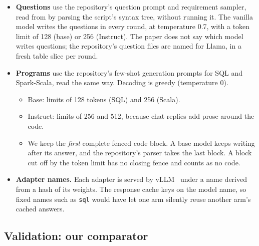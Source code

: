 \begin{itemize}
\item \textbf{Questions} use the repository's question prompt and requirement sampler, read from
 by parsing the script's syntax tree, without running it. The vanilla model
writes the questions in every round, at temperature 0.7, with a token limit of 128 (base) or 256 (Instruct). The paper
does not say which model writes questions; the repository's question files are named for Llama, in a fresh table slice
per round.
\item \textbf{Programs} use the repository's few-shot generation prompts for SQL and Spark-Scala, read the same way.
Decoding is greedy (temperature 0).
\begin{itemize}
\item Base: limits of 128 tokens (SQL) and 256 (Scala).
\item Instruct: limits of 256 and 512, because chat replies add prose around the code.
\item We keep the \emph{first} complete fenced code block. A base model keeps writing after its answer, and the
repository's parser takes the last block. A block cut off by the token limit has no closing fence and counts as no
code.
\end{itemize}
\item \textbf{Adapter names.} Each adapter is served by vLLM~\cite{kwon2023vllm} under a name derived from a hash of
its weights. The response cache keys on the model name, so fixed names such as \texttt{sql} would have let one arm
silently reuse another arm's cached answers.
\end{itemize}

\subsection{Validation: our comparator}\label{sec:comparator}


